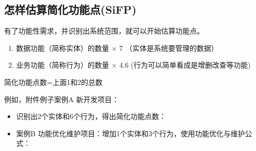 \documentclass{book}        %
\providecommand{\tightlist}{%
  \setlength{\itemsep}{0pt}\setlength{\parskip}{0pt}}
\begin{document}
\hypertarget{ux600eux6837ux4f30ux7b97ux7b80ux5316ux529fux80fdux70b9sifp}{%
\subsection{怎样估算简化功能点(SiFP)}\label{ux600eux6837ux4f30ux7b97ux7b80ux5316ux529fux80fdux70b9sifp}}

有了功能性需求，并识别出系统范围，就可以开始估算功能点。

\begin{enumerate}
\tightlist
\item
  数据功能（简称实体）的数量 × 7 （实体是系统要管理的数据）
\item
  业务功能（简称行为）的数量 × 4.6 (行为可以简单看成是增删改查等功能)
\end{enumerate}

\begin{description}
\tightlist
\item[]
简化功能点数=上面1和2的总数\\
\end{description}

例如，附件例子案例A 新开发项目：

\begin{itemize}
\tightlist
\item
  识别出2个实体和6个行为，得出简化功能点数：
\end{itemize}

\begin{description}
\item[]
\end{description}

\begin{itemize}
\tightlist
\item
  案例B 功能优化维护项目：增加1个实体和3个行为，使用功能优化与维护公式：
\end{itemize}

\begin{description}
\item[]
\end{description}
\end{document}
